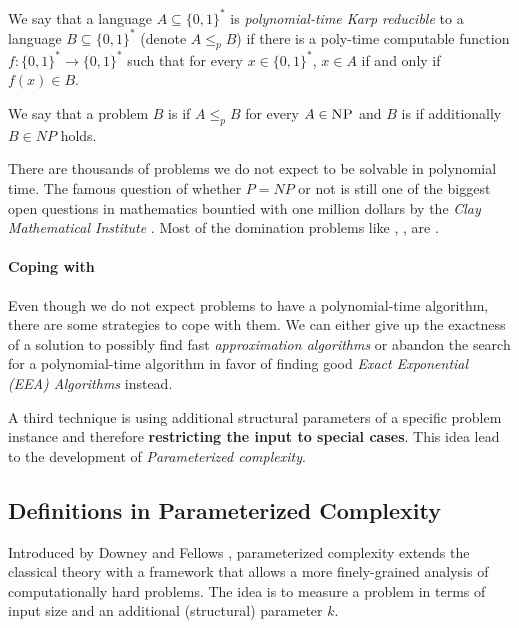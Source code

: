 \begin{definition}
We say that a language $A\subseteq \{0,1\}^*$ is \textit{polynomial-time Karp reducible} to a language $B \subseteq \{0,1\}^*$ (denote $A \leq_p B$) if there is a poly-time computable function $f: \{0,1\}^* \rightarrow \{0,1\}^*$ such that for every $x \in \{0,1\}^*$, $x \in A$ if and only if $f(x) \in B$.

\noindent We say that a problem $B$ is \NPh if $A \leq_p B$ for every $A \in \textsc{NP}$ and $B$ is \NPc if additionally $B \in NP$ holds.
\end{definition}

There are thousands of \NPc problems we do not expect to be solvable in polynomial time.
The famous question of whether $P = NP$ or not is still one of the biggest open questions in mathematics bountied with one million dollars by the \textit{Clay Mathematical Institute} \cite{Fortnow2021}. 
Most of the domination problems like \dom, \sdom, \tdom are \NPc.

\paragraph{Coping with \NPcn}

Even though we do not expect \NPc problems to have a polynomial-time algorithm, there are some strategies to cope with them. 
We can either give up the exactness of a solution to possibly find fast \textit{approximation algorithms} or abandon the search for a polynomial-time algorithm in favor of finding good \textit{Exact Exponential (EEA) Algorithms} instead.

A third technique is using additional structural parameters of a specific problem instance and therefore \textbf{restricting the input to special cases}. 
This idea lead to the development of \textit{Parameterized complexity}.

\subsection{Definitions in Parameterized Complexity}\label{cha:param}

Introduced by Downey and Fellows \cite{Downey1999a}, parameterized complexity extends the classical theory with a framework that allows a more finely-grained analysis of computationally hard problems. 
The idea is to measure a problem in terms of input size and an additional (structural) parameter $k$. 

